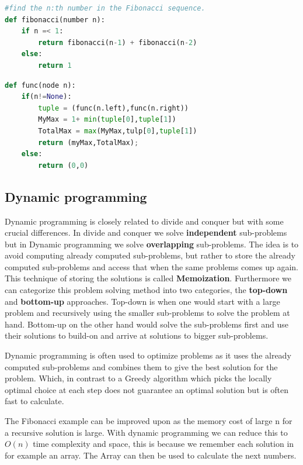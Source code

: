 \documentclass[12pt]{article} %
\begin{document}
\begin{lstlisting}[language=Python, caption=Fibbonaci in Python]
#find the n:th number in the Fibonacci sequence.
def fibonacci(number n):
    if n =< 1:
        return fibonacci(n-1) + fibonacci(n-2)
    else:
        return 1
\end{lstlisting}
\begin{lstlisting}[language=Python, caption=Perfect sub-tree in BST]
def func(node n):
    if(n!=None):
        tuple = (func(n.left),func(n.right))
        MyMax = 1+ min(tuple[0],tuple[1])
        TotalMax = max(MyMax,tulp[0],tuple[1])
        return (myMax,TotalMax);
    else:
        return (0,0)
\end{lstlisting}

\subsection{Dynamic programming} %
Dynamic programming is closely related to divide and conquer but with some crucial differences. In divide and conquer we solve \textbf{independent} sub-problems but in Dynamic programming we solve \textbf{overlapping} sub-problems. The idea is to avoid computing already computed sub-problems, but rather to store the already computed sub-problems and access that when the same problems comes up again. This technique of storing the solutions is called \textbf{Memoization}. Furthermore we can categorize this problem solving method into two categories, the \textbf{top-down} and \textbf{bottom-up} approaches. Top-down is when one would start with a large problem and recursively using the smaller sub-problems to solve the problem at hand. Bottom-up on the other hand would solve the sub-problems first and use their solutions to build-on and arrive at solutions to bigger sub-problems.

\par Dynamic programming is often used to optimize problems as it uses the already computed sub-problems and combines them to give the best solution for the problem. Which, in contrast to a Greedy algorithm which picks the locally optimal choice at each step does not guarantee an optimal solution but is often fast to calculate.

\par The Fibonacci example can be improved upon as the memory cost of large n for a recursive solution is large. With dynamic programming we can reduce this to $O(n)$ time complexity and space, this is because we remember each solution in for example an array. The Array can then be used to calculate the next numbers.
\end{document}
